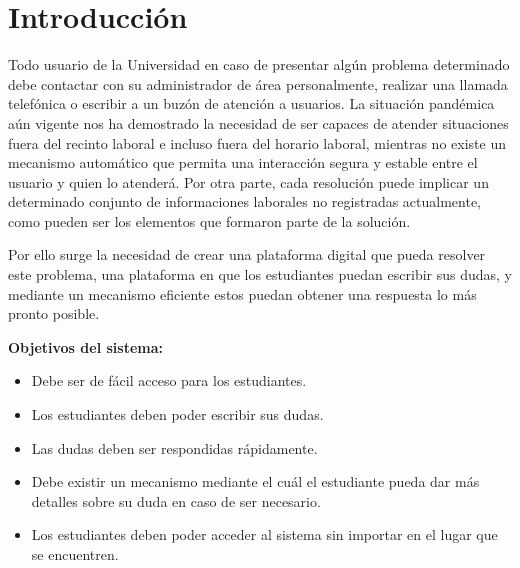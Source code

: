 \chapter*{Introducción}\label{chapter:introduction}

Todo usuario de la Universidad en caso de presentar algún problema determinado debe contactar con su administrador de área personalmente, realizar una llamada telefónica o escribir a un buzón de atención a usuarios. La situación pandémica aún vigente nos ha demostrado la necesidad de ser capaces de atender situaciones fuera del recinto laboral e incluso fuera del horario laboral, mientras no existe un mecanismo automático que permita una interacción segura y estable entre el usuario y quien lo atenderá. Por otra parte, cada resolución puede implicar un determinado conjunto de informaciones laborales no registradas actualmente, como pueden ser los elementos que formaron parte de la solución.\newline

Por ello surge la necesidad de crear una plataforma digital que pueda resolver este problema, una plataforma en que los estudiantes puedan escribir sus dudas, y mediante un mecanismo eficiente estos puedan obtener una respuesta lo más pronto posible.
\newline

\textbf{Objetivos del sistema:}

\begin{itemize}
	\item Debe ser de fácil acceso para los estudiantes.
	
	\item Los estudiantes deben poder escribir sus dudas.
	
	\item Las dudas deben ser respondidas rápidamente.
	
	\item Debe existir un mecanismo mediante el cuál el estudiante pueda dar más detalles sobre su duda en caso de ser necesario.
	
	\item Los estudiantes deben poder acceder al sistema sin importar en el lugar que se encuentren.
\end{itemize}